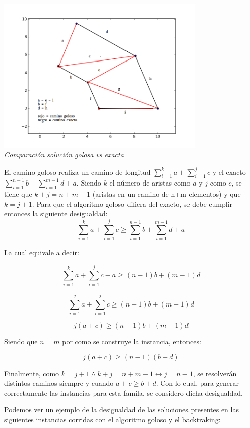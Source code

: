 \vspace*{0.3cm} \vspace*{0.3cm}
  \begin{center}
 \includegraphics[width=0.75\textwidth]{./EJ2/dibujoorientativo.png}
\\{\textit{Comparación solución golosa vs exacta}}
  \end{center}

El camino goloso realiza un camino de longitud $\sum^{k}_{i=1}a + \sum^{j}_{i=1}c$ y el exacto $\sum^{n-1}_{i=1}b + \sum^{m-1}_{i=1}d + a$. Siendo $k$ el número de aristas como $a$ y $j$ como $c$, se tiene que $k + j = n+m-1$ (aristas en un camino de n+m elementos) y que $k=j+1$. Para que el algoritmo goloso difiera del exacto, se debe cumplir entonces la siguiente desigualdad:
\[
\sum^{k}_{i=1}a + \sum^{j}_{i=1}c \ge \sum^{n-1}_{i=1}b + \sum^{m-1}_{i=1}d + a
\]

La cual equivale a decir:

\[
\sum^{k}_{i=1}a + \sum^{j}_{i=1}c - a \ge (n-1)b + (m-1)d
\]

\[
\sum^{j}_{i=1}a + \sum^{j}_{i=1}c \ge (n-1)b + (m-1)d
\]

\[
j(a + c)\ge (n-1)b + (m-1)d
\]

Siendo que $n=m$ por como se construye la instancia, entonces:


\[
j(a + c) \ge (n-1)(b + d)
\]

Finalmente, como $k = j + 1 \wedge k+j=n+m-1 \leftrightarrow j = n - 1 $, se resolverán distintos caminos siempre y cuando $a +c \ge b + d$. Con lo cual, para generar correctamente las instancias para esta famila, se considero dicha desigualdad.

Podemos ver un ejemplo de la desigualdad de las soluciones presentes en las siguientes instancias corridas con el algoritmo goloso y el backtraking:
 
